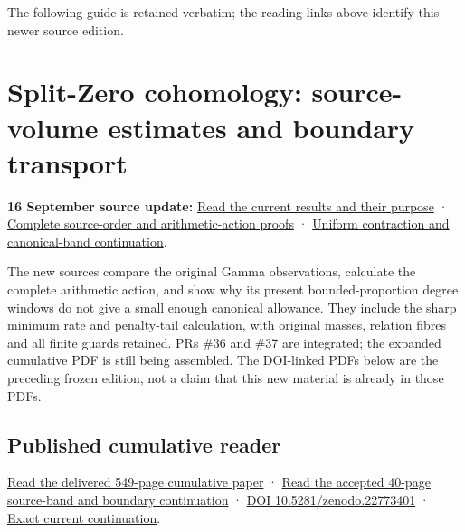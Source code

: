 \documentclass[
]{article}
\begin{document}
The following guide is retained verbatim; the reading links above
identify this newer source edition.

\section{Split-Zero cohomology: source-volume estimates and boundary
transport}\label{split-zero-cohomology-source-volume-estimates-and-boundary-transport}

\textbf{16 September source update:}
\href{workbenches/tau-programme-coordination/INTEGRATION_20260916.md}{Read
the current results and their purpose} ·
\href{workbenches/splitzero-tandem/continuations/20260916-source-order-and-action/README.md}{Complete
source-order and arithmetic-action proofs} ·
\href{workbenches/tau-exponential-contraction/RESEARCH_NOTE.md}{Uniform
contraction and canonical-band continuation}.

The new sources compare the original Gamma observations, calculate the
complete arithmetic action, and show why its present bounded-proportion
degree windows do not give a small enough canonical allowance. They
include the sharp minimum rate and penalty-tail calculation, with
original masses, relation fibres and all finite guards retained. PRs
\#36 and \#37 are integrated; the expanded cumulative PDF is still being
assembled. The DOI-linked PDFs below are the preceding frozen edition,
not a claim that this new material is already in those PDFs.

\subsection{Published cumulative
reader}\label{published-cumulative-reader}

\href{https://zenodo.org/api/records/22773401/files/74-primitive-band-reader.pdf/content}{Read
the delivered 549-page cumulative paper} ·
\href{https://zenodo.org/api/records/22773401/files/75-primitive-band-supplement.pdf/content}{Read
the accepted 40-page source-band and boundary continuation} ·
\href{https://doi.org/10.5281/zenodo.22773401}{DOI
10.5281/zenodo.22773401} ·
\href{https://github.com/KokunoYumeto/zeta-function-research-reader/blob/02e47c28b98912d3ea1ec1bf01a3a5ba44197e9f/workbenches/splitzero-tandem/continuations/20260915-primitive-band-continuation/00_CONTINUE_HERE.md}{Exact
current continuation}.
\end{document}
